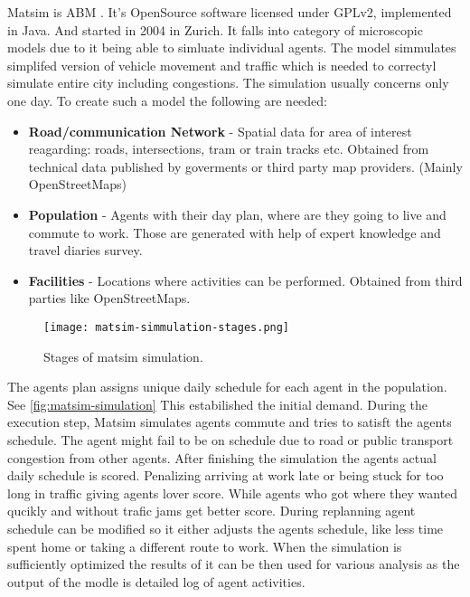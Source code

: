 Matsim  is \acrfull{ABM} . It's OpenSource software licensed under GPLv2, implemented in Java. And started in 2004 in Zurich. It falls into category of microscopic models due to it being able to simluate individual agents. The model simmulates simplifed version of vehicle movement and traffic which is needed to correctyl simulate entire city including congestions. The simulation usually concerns only one day. To create such a model the following are needed:
\begin{itemize}
    \item \textbf{Road/communication Network} - Spatial data for area of interest reagarding: roads, intersections, tram or train tracks etc. Obtained from technical data published by goverments or third party map providers. (Mainly OpenStreetMaps)
    \item \textbf{Population} - Agents with their day plan, where are they going to live and commute to work. Those are generated with help of expert knowledge and travel diaries survey.
    \item \textbf{Facilities} - Locations where activities can be performed. Obtained from third parties like OpenStreetMaps.
\end{itemize}

\begin{figure}
    \texttt{[image: matsim-simmulation-stages.png]}
    \caption[Matsim, Simulation stages]{Stages of matsim simulation. \cite{Horni2016}}
\end{figure}

The agents plan assigns unique daily schedule for each agent in the population. See \ref{fig:matsim-simulation} This estabilished the initial demand. During the execution step, Matsim simulates agents commute and tries to satisft the agents schedule. The agent might fail to be on schedule due to road or public transport congestion from other agents. After finishing the simulation the agents actual daily schedule is scored. Penalizing arriving at work late or being stuck for too long in traffic giving agents lover score. While agents who got where they wanted qucikly and without trafic jams get better score. During replanning agent schedule can be modified so it either adjusts the agents schedule, like less time spent home or taking a different route to work. When the simulation is sufficiently optimized the results of it can be then used for various analysis as the output of the modle is detailed log of agent activities.

